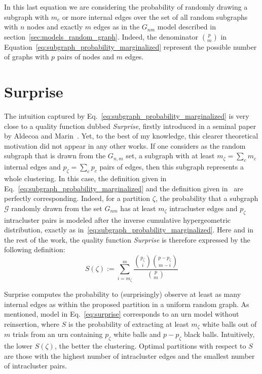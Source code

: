 In this last equation we are considering the probability of randomly drawing a subgraph with $m_c$ or more internal edges over the set of all random subgraphs with $n$ nodes and exactly $m$ edges as in the $G_{nm}$ model described in section~\ref{sec:models_random_graph}. Indeed, the denominator $\binom{p}{m}$ in Equation~\ref{eq:subgraph_probability_marginalized} represent the possible number of graphs with $p$ pairs of nodes and $m$ edges. 

\section{Surprise}
The intuition captured by Eq.~\ref{eq:subgraph_probability_marginalized} is very close to a quality function dubbed \emph{Surprise}, firstly introduced in a seminal paper by Aldecoa and Marin~\cite{aldecoa2011}.
Yet, to the best of my knowledge, this clearer theoretical motivation did not appear in any other works.
If one considers as the random subgraph that is drawn from the $G_{n,m}$ set, a subgraph with at least $m_\zeta=\sum_c m_c$ internal edges and $p_\zeta=\sum_c p_c$ pairs of edges, then this subgraph represents a whole clustering.
In this case, the definition given in Eq.~\ref{eq:subgraph_probability_marginalized} and the definition given in~\cite{aldecoa2011} are perfectly corresponding.
Indeed, for a partition $\zeta$, the probability that a subgraph $\mathcal{G}$ randomly drawn from the set $G_{nm}$ has at least $m_\zeta$ intracluster edges and $p_\zeta$ intracluster pairs is modeled after the inverse cumulative hypergeometric distribution, exactly as in~\ref{eq:subgraph_probability_marginalized}.
Here and in the rest of the work, the quality function \emph{Surprise} is therefore expressed by the following definition:
\begin{equation}\label{eq:surprise}
S(\zeta) := \sum_{i = m_\zeta}^m \dfrac{\binom{p_\zeta}{i} \binom{p-p_\zeta}{m-i} }{\binom{p}{m}}
\end{equation}

Surprise computes the probability to (surprisingly) observe at least as many internal edges as within the proposed partition in a uniform random graph.
As mentioned, model in Eq.~\ref{eq:surprise} corresponds to an urn model without reinsertion, where $S$ is the probability of extracting at least $m_\zeta$ white balls out of $m$ trials from an urn containing $p_\zeta$ white balls and $p-p_\zeta$ black balls.
Intuitively, the lower $S(\zeta)$, the better the clustering. Optimal partitions with respect to $S$ are those with the highest number of intracluster edges and the smallest number of intracluster pairs. 

